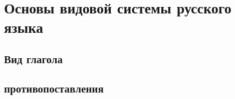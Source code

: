 \section{Основы видовой системы русского языка}

\subsection{Вид глагола}

\subsection{противопоставления}
